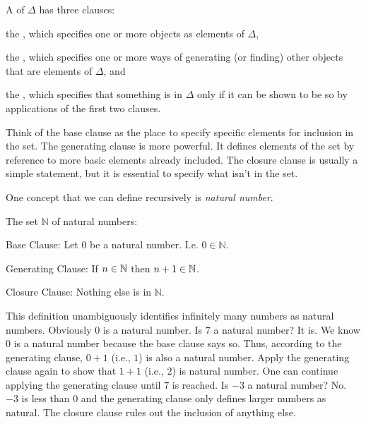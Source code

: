 \begin{majorILnc}{}
A  of $\Delta$ has three clauses:
\begin{cenumerate}
\item the , which specifies one or more objects as elements of $\Delta$,
\item the , which specifies one or more ways of generating (or finding) other objects that are elements of $\Delta$, and
\item the , which specifies that something is in $\Delta$ only if it can be shown to be so by applications of the first two clauses.
\end{cenumerate}
\end{majorILnc}

\noindent{}Think of the base clause as the place to specify specific elements for inclusion in the set.
The generating clause is more powerful.
It defines elements of the set by reference to more basic elements already included.
The closure clause is usually a simple statement, but it is essential to specify what isn't in the set.

One concept that we can define recursively is \emph{natural number}.
\begin{majorILnc}{} The set $\mathbb{N}$ of natural numbers:
	\begin{cenumerate}
		\item Base Clause: Let $0$ be a natural number. I.e. $0 \in \mathbb{N}$.
		\item Generating Clause: If $n \in \mathbb{N}$ then $n+1 \in \mathbb{N}$.
		\item Closure Clause: Nothing else is in $\mathbb{N}$.  
	\end{cenumerate}
\end{majorILnc}
This definition unambiguously identifies infinitely many numbers as natural numbers. 
Obviously $0$ is a natural number. 
Is $7$ a natural number? 
It is. We know $0$ is a natural number because the base clause says so. 
Thus, according to the generating clause, $0+1$ (i.e., $1$) is also a natural number. Apply the generating clause again to show that $1+1$ (i.e., $2$) is natural number. One can continue applying the generating clause until $7$ is reached. 
Is $-3$ a natural number? No. $-3$ is less than $0$ and the generating clause only defines larger numbers as natural. The closure clause rules out the inclusion of anything else.


